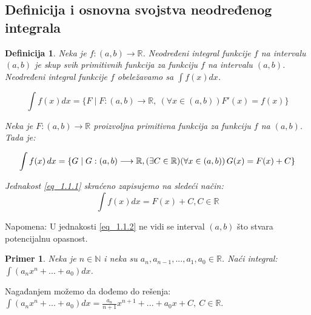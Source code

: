 \documentclass{article}
\newtheorem{definicija}{Definicija}[section]
\newtheorem{prim}{Primer}[section]
\begin{document}
\subsection{Definicija i osnovna svojstva neodređenog integrala}
\begin{definicijabox}
    \begin{definicija}
        Neka je $f: (a, b) \longrightarrow \mathbb{R}$.
        Neodređeni integral funkcije $f$ na intervalu $(a, b)$ je
        skup svih primitivnih funkcija za funkciju $f$ na intervalu
        $(a, b)$. Neodređeni integral funkcije $f$ obeležavamo sa
        $\int f(x)dx$.\par
        $$\int f(x) dx = \{F \mid F: (a, b) \longrightarrow \mathbb{R},\
            (\forall x\in(a,b)) F'(x) = f(x)\}$$\par
        Neka je $F: (a,b) \longrightarrow \mathbb{R}$ proizvoljna
        primitivna funkcija za funkciju $f$ na $(a,b)$. Tada je: \par

        \setcounter{equation}{0}

        \begin{equation} \label{eq_1.1.1}
            \int f(x) \, dx =\{G \mid G: (a, b)
            \longrightarrow \mathbb{R}, \\
            (\exists C \in \mathbb{R}) (\forall x \in (a, b))
            \, G(x) = F(x) + C\}
        \end{equation}

        Jednakost \eqref{eq_1.1.1} skraćeno zapisujemo na sledeći način:
        \begin{equation}\label{eq_1.1.2}
            \int f(x)dx = F(x) + C, C\in\mathbb{R}
        \end{equation}
    \end{definicija}
    Napomena: U jednakosti \eqref{eq_1.1.2} ne vidi se interval $(a, b)$ što
    stvara potencijalnu opasnost.
\end{definicijabox}

\begin{primbox}
    \begin{prim}
        Neka je $n \in \mathbb{N}$ i neka su $a_n, a_{n-1},
            ..., a_1, a_0 \in \mathbb{R}$. Naći integral:
        $\int (a_n  x^n + ... + a_0)dx$.
    \end{prim}
    Nagađanjem možemo da dođemo do rešenja:
    $\int (a_n  x^n + ... + a_0)dx=\frac{a_n}{n+1}x^{n+1} + ... +
        a_0x + C,\ C\in\mathbb{R}$.
\end{primbox}
\end{document}
